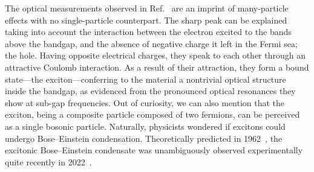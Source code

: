 The optical measurements observed in Ref.~\cite{da_Jornada_Zhang_2014} are an imprint of many-particle effects with no single-particle counterpart.
The sharp peak can be explained taking into account the interaction between the electron excited to the bands above the bandgap, and the absence of negative charge it left in the Fermi sea; the hole.
Having opposite electrical charges, they speak to each other through an attractive Coulomb interaction.
As a result of their attraction, they form a bound state---the exciton---conferring to the material a nontrivial optical structure inside the bandgap, as evidenced from the pronounced optical resonances they show at sub-gap frequencies.
Out of curiosity, we can also mention that the exciton, being a composite particle composed of two fermions, can be perceived as a single bosonic particle.
Naturally, physicists wondered if excitons could undergo Bose--Einstein condensation.
Theoretically predicted in 1962~\cite{PhysRev.126.1691}, the excitonic Bose--Einstein condensate was unambiguously observed experimentally quite recently in 2022~\cite{Morita_Yoshioka_Kuwata-Gonokami_2022}.

